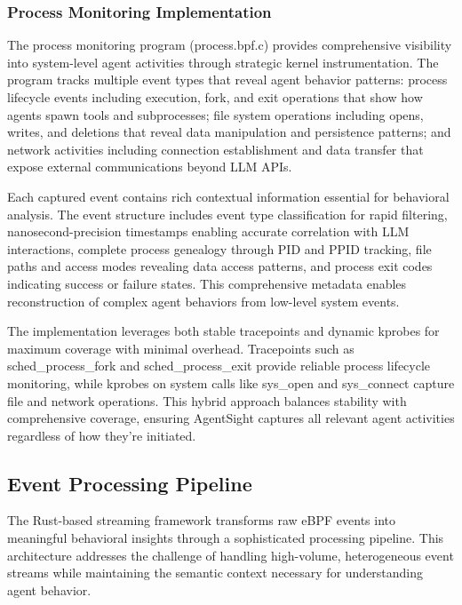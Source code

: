 \subsubsection{Process Monitoring Implementation}

The process monitoring program (process.bpf.c) provides comprehensive visibility into system-level agent activities through strategic kernel instrumentation. The program tracks multiple event types that reveal agent behavior patterns: process lifecycle events including execution, fork, and exit operations that show how agents spawn tools and subprocesses; file system operations including opens, writes, and deletions that reveal data manipulation and persistence patterns; and network activities including connection establishment and data transfer that expose external communications beyond LLM APIs.

Each captured event contains rich contextual information essential for behavioral analysis. The event structure includes event type classification for rapid filtering, nanosecond-precision timestamps enabling accurate correlation with LLM interactions, complete process genealogy through PID and PPID tracking, file paths and access modes revealing data access patterns, and process exit codes indicating success or failure states. This comprehensive metadata enables reconstruction of complex agent behaviors from low-level system events.

The implementation leverages both stable tracepoints and dynamic kprobes for maximum coverage with minimal overhead. Tracepoints such as sched\_process\_fork and sched\_process\_exit provide reliable process lifecycle monitoring, while kprobes on system calls like sys\_open and sys\_connect capture file and network operations. This hybrid approach balances stability with comprehensive coverage, ensuring AgentSight captures all relevant agent activities regardless of how they're initiated.

\subsection{Event Processing Pipeline}

The Rust-based streaming framework transforms raw eBPF events into meaningful behavioral insights through a sophisticated processing pipeline. This architecture addresses the challenge of handling high-volume, heterogeneous event streams while maintaining the semantic context necessary for understanding agent behavior.

